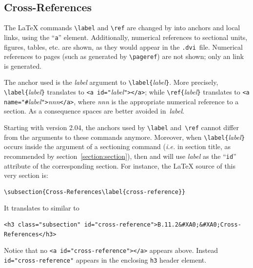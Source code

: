 \subsection{Cross-References\label{cross-reference}\label{cross}}
The \LaTeX{} commands \verb+\label+ and \verb+\ref+ are changed by \hevea{}
into {\html} anchors and local links, using the ``\verb+a+'' element.
Additionally, numerical references to sectional units, figures,
tables, etc. are shown, as they would appear in the \texttt{.dvi}~file.
Numerical references to pages (such as generated by \verb+\pageref+)
are not shown; only an link is generated.

The anchor used is the \textit{label} argument to
\verb+\label{+\textit{label}\verb+}+.
More precisely, \verb+\label{+\textit{label}\verb+}+ translates to
\verb+<a id="+\textit{label}\verb+"></a>+;
while \verb+\ref{+\textit{label}\verb+}+
translates to \verb+<a name="#+\textit{label}\verb+">+\textit{nnn}\verb+</a>+,
where \textit{nnn} is the appropriate numerical reference to a section.
As a consequence spaces are better avoided in~\textit{label}.

Starting with \hevea{} version 2.04,
the \html{} anchors used by \verb+\label+ and~\verb+\ref+ cannot
differ from the arguments to these commands anymore.
Moreover,
when \verb+\label{+\textit{label}\verb+}+ occurs
inside the argument of a sectioning command (\emph{i.e.} in section title,
as recommended by section~\ref{section:section}),
then \hevea{} and \hacha{} will use \textit{label}
as the ``\texttt{id}'' attribute of the corresponding section.
For instance, the \LaTeX{} source of this very section is:
\begin{verbatim}
\subsection{Cross-References\label{cross-reference}}
\end{verbatim}
It translates to \html{} similar to
\begin{verbatim}
<h3 class="subsection" id="cross-reference">B.11.2&#XA0;&#XA0;Cross-References</h3>
\end{verbatim}
Notice that no \verb+<a id="cross-reference"></a>+ appears above.
Instead \verb+id="cross-reference"+ appears
in the enclosing \verb+h3+ header element.


